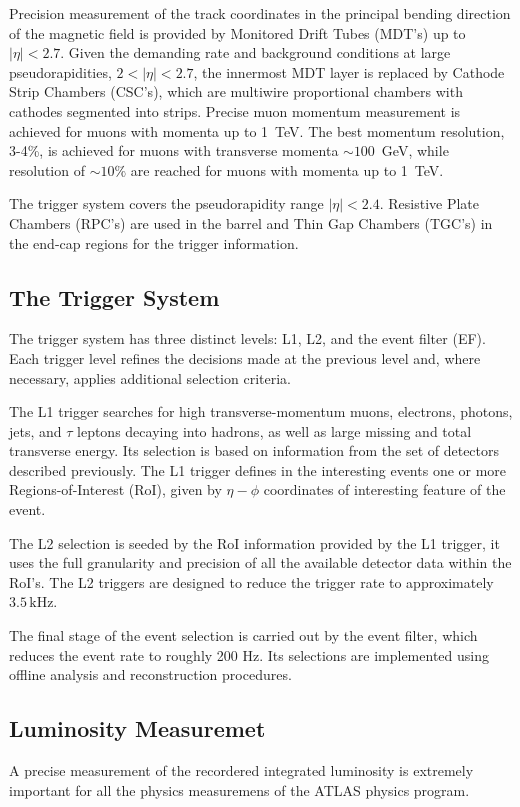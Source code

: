 Precision measurement of the track coordinates in the principal bending direction of the 
magnetic field is provided by Monitored Drift Tubes (MDT’s) up to $|\eta| < 2.7$. Given the demanding rate and background conditions
at large pseudorapidities, $2 < |\eta| < 2.7$, the innermost MDT layer is replaced by  Cathode Strip Chambers (CSC’s), which are multiwire
proportional chambers with cathodes segmented into strips. Precise muon momentum measurement is achieved for muons with momenta up to 1~TeV.
The best momentum resolution, 3-4\%, is achieved for muons with transverse momenta $\sim 100$~GeV, while resolution of $\sim 10\%$ are reached for muons
with momenta up to 1~TeV. 

The trigger system covers the pseudorapidity range $|\eta| < 2.4$. Resistive Plate Chambers
(RPC’s) are used in the barrel and Thin Gap Chambers (TGC’s) in the end-cap regions for the trigger information. 


\subsection{The Trigger System}
The trigger system has three distinct levels: L1, L2, and the event filter (EF). Each trigger level
refines the decisions made at the previous level and, where necessary, applies additional selection
criteria.

The L1 trigger searches for high transverse-momentum muons, electrons, photons, jets, and $\tau$ 
leptons decaying into hadrons, as well as large missing and total transverse energy.
Its selection is based on information from the set of detectors described previously.
The L1 trigger defines in the interesting events one or more Regions-of-Interest (RoI), given by $\eta-\phi$ coordinates
of interesting feature of the event.

The L2 selection is seeded by the RoI information provided by the L1 trigger, it uses the full granularity and precision of 
all the available detector data within the RoI’s. The L2 triggers are designed to reduce the
trigger rate to approximately $3.5\,\text{kHz}$.

The final stage of the event selection is carried out by the event filter, which reduces
the event rate to roughly 200 Hz. Its selections are implemented using offline analysis and reconstruction procedures.


\subsection{Luminosity Measuremet}
A precise measurement of the recordered integrated luminosity is extremely important for all the physics measuremens of the ATLAS physics program.

